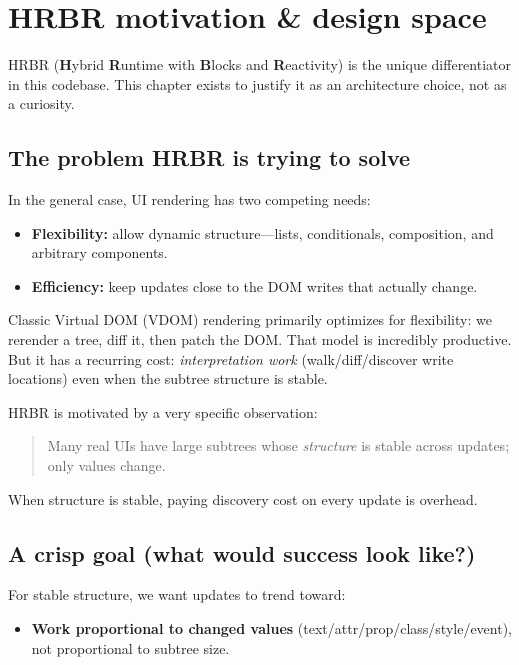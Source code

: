 \chapter{HRBR motivation \& design space}
\label{ch:hrbr-motivation}

HRBR (\textbf{H}ybrid \textbf{R}untime with \textbf{B}locks and \textbf{R}eactivity) is the unique differentiator in this codebase.
This chapter exists to justify it as an architecture choice, not as a curiosity.

\section{The problem HRBR is trying to solve}

In the general case, UI rendering has two competing needs:

\begin{itemize}
  \item \textbf{Flexibility:} allow dynamic structure---lists, conditionals, composition, and arbitrary components.
  \item \textbf{Efficiency:} keep updates close to the DOM writes that actually change.
\end{itemize}

Classic Virtual DOM (VDOM) rendering primarily optimizes for flexibility:
we rerender a tree, diff it, then patch the DOM.
That model is incredibly productive.
But it has a recurring cost: \emph{interpretation work} (walk/diff/discover write locations) even when the subtree structure is stable.

HRBR is motivated by a very specific observation:

\begin{quote}
Many real UIs have large subtrees whose \emph{structure} is stable across updates; only values change.
\end{quote}

When structure is stable, paying discovery cost on every update is overhead.

\section{A crisp goal (what would success look like?)}

For stable structure, we want updates to trend toward:

\begin{itemize}
  \item \textbf{Work proportional to changed values} (text/attr/prop/class/style/event), not proportional to subtree size.
\end{itemize}

